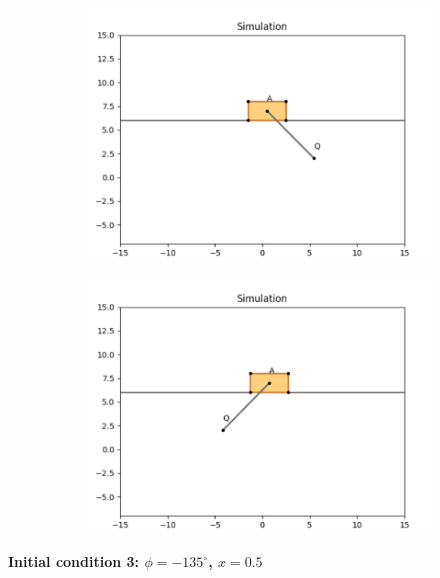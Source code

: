 \documentclass{article}
\begin{document}
\begin{figure}[htbp]
  \centering
  \begin{subfigure}[t]{0.45\linewidth}
    \centering
    \includegraphics[width=\linewidth]{simulation/init2_1.png}
    \caption{}
  \end{subfigure}
  \begin{subfigure}[t]{0.45\linewidth}
    \centering
    \includegraphics[width=\linewidth]{simulation/init2_2.png}
    \caption{}
  \end{subfigure}
\end{figure}

\newpage

\textbf{Initial condition 3: $\phi = -135^\circ$, $x = 0.5$}
\end{document}

